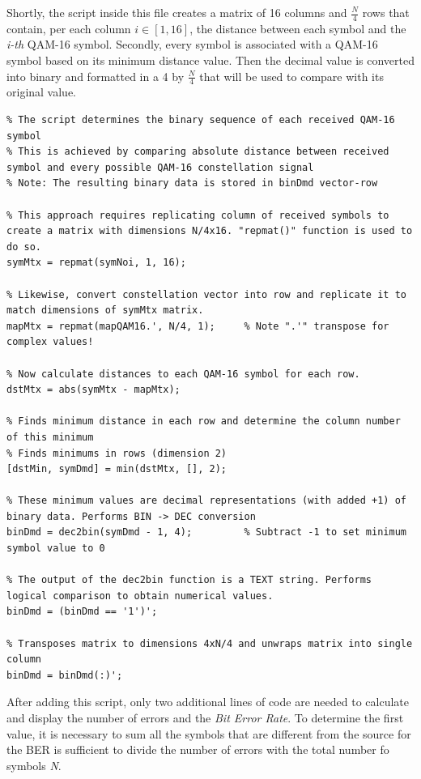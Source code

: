 Shortly, the script inside this file creates a matrix of 16 columns and $\frac{N}{4}$ rows that contain, per each column $i\in [1, 16]$, the distance between each symbol and the \textit{i-th} QAM-16 symbol. Secondly, every symbol is associated with a QAM-16 symbol based on its minimum distance value. Then the decimal value is converted into binary and formatted in a 4 by $\frac{N}{4}$ that will be used to compare with its original value.

\begin{lstlisting} 
% The script determines the binary sequence of each received QAM-16 symbol
% This is achieved by comparing absolute distance between received symbol and every possible QAM-16 constellation signal
% Note: The resulting binary data is stored in binDmd vector-row

% This approach requires replicating column of received symbols to create a matrix with dimensions N/4x16. "repmat()" function is used to do so.
symMtx = repmat(symNoi, 1, 16);

% Likewise, convert constellation vector into row and replicate it to match dimensions of symMtx matrix.
mapMtx = repmat(mapQAM16.', N/4, 1);     % Note ".'" transpose for complex values!

% Now calculate distances to each QAM-16 symbol for each row.
dstMtx = abs(symMtx - mapMtx);

% Finds minimum distance in each row and determine the column number of this minimum
% Finds minimums in rows (dimension 2)
[dstMin, symDmd] = min(dstMtx, [], 2);

% These minimum values are decimal representations (with added +1) of binary data. Performs BIN -> DEC conversion
binDmd = dec2bin(symDmd - 1, 4);         % Subtract -1 to set minimum symbol value to 0

% The output of the dec2bin function is a TEXT string. Performs logical comparison to obtain numerical values.
binDmd = (binDmd == '1')';

% Transposes matrix to dimensions 4xN/4 and unwraps matrix into single column
binDmd = binDmd(:)'; 
\end{lstlisting}

After adding this script, only two additional lines of code are needed to calculate and display the number of errors and the \textsl{Bit Error Rate}. To determine the first value, it is necessary to sum all the symbols that are different from the source for the BER is sufficient to divide the number of errors with the total number fo symbols \textit{N}.


